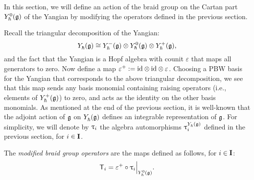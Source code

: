 In this section, we will define an action of the braid group on the Cartan part $\Yhg[0]$ of the Yangian by modifying the operators defined in the previous section.

Recall the triangular decomposition of the Yangian:
\[\Yhg \cong \Yhg[-]\otimes\Yhg[0]\otimes\Yhg[+],\]
and the fact that the Yangian is a Hopf algebra with counit $\varepsilon$ that maps all generators to zero.
Now define a map $\varepsilon^+:={\id}\otimes{\id}\otimes\varepsilon$.
Choosing a PBW basis for the Yangian that corresponds to the above triangular decomposition, we see that this map sends any basis monomial containing raising operators (i.e., elements of $\Yhg[+]$) to zero, and acts as the identity on the other basis monomials.
As mentioned at the end of the previous section, it is well-known that the adjoint action of $\g$ on $\Yhg$ defines an integrable representation of $\g$.
For simplicity, we will denote by $\braid_i$ the algebra automorphisms $\braid_i^{\Yhg}$ defined in the previous section, for $i\in\I$.

\begin{definition}\label{D:mbraid}
    The \emph{modified braid group operators} are the maps defined as follows, for $i\in\I$:
    \[\mbraid_i = \varepsilon^+ \circ \braid_i\Big|_{\Yhg[0]}.\]
\end{definition}

